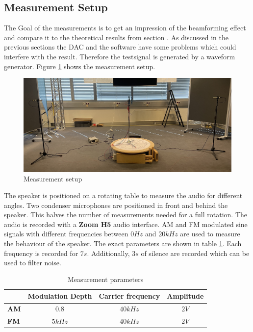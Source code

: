 \subsection{Measurement Setup}

The Goal of the measurements is to get an impression of the beamforming effect and compare it to the theoretical results from section . As discussed in the previous sections the DAC and the software have some problems which could interfere with the result. Therefore the testsignal is generated by a waveform generator. Figure \ref{fig:meas:beam:setup} shows the measurement setup.
%
\begin{figure}
  \centering
  \includegraphics[height=\smallheight]{src/assets/pictures/measurements/beamforming_meas_setup.JPG}
  \caption{Measurement setup}\label{fig:meas:beam:setup}
\end{figure}
\p
The speaker is positioned on a rotating table to measure the audio for different angles. Two condenser microphones are positioned in front and behind the speaker. This halves the number of measurements needed for a full rotation. The audio is recorded with a \textbf{Zoom H5} audio interface.\p
%
AM and FM modulated sine signals with different frequencies between $0Hz$ and $20kHz$ are used to measure the behaviour of the speaker. The exact parameters are shown in table \ref{tab:meas:beam:params}. Each frequency is recorded for $7s$. Additionally, $3s$ of silence are recorded which can be used to filter noise.
%
\begin{table}
  \caption{Measurement parameters}\label{tab:meas:beam:params}
  \begin{tabular}{l||c|c|c}
    & \textbf{Modulation Depth} & \textbf{Carrier frequency}  & \textbf{Amplitude}\\
    \hline
    \textbf{AM} & $0.8$         & $40kHz$                     & $2V$ \\
    \textbf{FM} & $5kHz$        & $40kHz$                     & $2V$ \\
  \end{tabular}
\end{table}